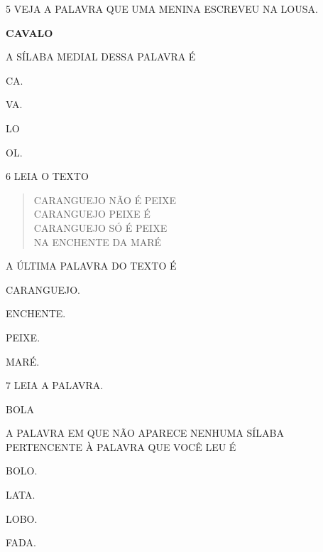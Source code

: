 \pagebreak

\num{5} VEJA A PALAVRA QUE UMA MENINA ESCREVEU NA LOUSA.

\begin{myquote}
\centering\LARGE\textbf{CAVALO}
\end{myquote}

A SÍLABA MEDIAL DESSA PALAVRA É

\begin{escolha}
\item CA.

\item VA.

\item LO

\item OL.
\end{escolha}


\num{6} LEIA O TEXTO

\begin{myquote}
\begin{verse}
CARANGUEJO NÃO É PEIXE\\
CARANGUEJO PEIXE É\\
CARANGUEJO SÓ É PEIXE\\
NA ENCHENTE DA MARÉ
\end{verse}

\end{myquote}

A ÚLTIMA PALAVRA DO TEXTO É

\begin{escolha}
\item CARANGUEJO.

\item ENCHENTE.

\item PEIXE.

\item MARÉ.
\end{escolha}

\pagebreak

\num{7} LEIA A PALAVRA.

\begin{myquote}
\centering\large{BOLA}
\end{myquote}

A PALAVRA EM QUE NÃO APARECE NENHUMA SÍLABA PERTENCENTE À PALAVRA QUE VOCÊ LEU É 

\begin{escolha}
\item BOLO.

\item LATA.

\item LOBO.

\item FADA.
\end{escolha}


